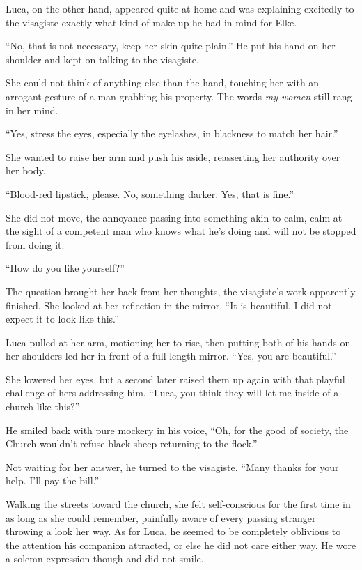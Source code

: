 Luca, on the other hand, appeared quite at home and was explaining excitedly to the visagiste exactly what kind of make-up he had in mind for Elke.

``No, that is not necessary, keep her skin quite plain.'' He put his hand on her shoulder and kept on talking to the visagiste.

She could not think of anything else than the hand, touching her with an arrogant gesture of a man grabbing his property. The words \emph{my women} still rang in her mind.

``Yes, stress the eyes, especially the eyelashes, in blackness to match her hair.''

She wanted to raise her arm and push his aside, reasserting her authority over her body.

``Blood-red lipstick, please. No, something darker. Yes, that is fine.''

She did not move, the annoyance passing into something akin to calm, calm at the sight of a competent man who knows what he's doing and will not be stopped from doing it.

``How do you like yourself?''

The question brought her back from her thoughts, the visagiste's work apparently finished. She looked at her reflection in the mirror. ``It is beautiful. I did not expect it to look like this.''

Luca pulled at her arm, motioning her to rise, then putting both of his hands on her shoulders led her in front of a full-length mirror. ``Yes, you are beautiful.''

She lowered her eyes, but a second later raised them up again with that playful challenge of hers addressing him. ``Luca, you think they will let me inside of a church like this?''

He smiled back with pure mockery in his voice, ``Oh, for the good of society, the Church wouldn't refuse black sheep returning to the flock.''

Not waiting for her answer, he turned to the visagiste. ``Many thanks for your help. I'll pay the bill.''

Walking the streets toward the church, she felt self-conscious for the first time in as long as she could remember, painfully aware of every passing stranger throwing a look her way. As for Luca, he seemed to be completely oblivious to the attention his companion attracted, or else he did not care either way. He wore a solemn expression though and did not smile.

